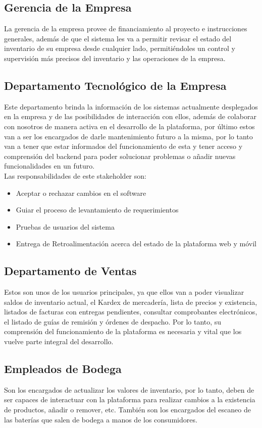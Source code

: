 \documentclass{scrreprt}
\begin{document}
\subsection{Gerencia de la Empresa}
La gerencia de la empresa provee de financiamiento al proyecto e instrucciones generales, además de que el sistema les va a permitir revisar el estado del inventario de su empresa desde cualquier lado, permitiéndoles un control y supervisión más precisos del inventario y las operaciones de la empresa. 

\subsection{Departamento Tecnológico de la Empresa}
Este departamento brinda la información de los sistemas actualmente desplegados en la empresa y de las posibilidades de interacción con ellos, además de colaborar con nosotros de manera activa en el desarrollo de la plataforma, por último estos van a ser los encargados de darle mantenimiento futuro a la misma, por lo tanto van a tener que estar informados del funcionamiento de esta y tener acceso y comprensión del backend para poder solucionar problemas o añadir nuevas funcionalidades en un futuro.\\
Las responsabilidades de este stakeholder son:
\begin{itemize}
    \item Aceptar o rechazar cambios en el software
    \item Guiar el proceso de levantamiento de requerimientos 
    \item Pruebas de usuarios del sistema
    \item Entrega de Retroalimentación acerca del estado de la plataforma web y móvil
\end{itemize}

\subsection{Departamento de Ventas}
Estos son unos de los usuarios principales, ya que ellos van a poder visualizar saldos de inventario actual, el Kardex de mercadería, lista de precios y existencia, listados de facturas con entregas pendientes, consultar comprobantes electrónicos, el listado de guías de remisión y órdenes de despacho. Por lo tanto, su comprensión del funcionamiento de la plataforma es necesaria y vital que los vuelve parte integral del desarrollo. 

\subsection{Empleados de Bodega}
Son los encargados de actualizar los valores de inventario, por lo tanto, deben de ser capaces de interactuar con la plataforma para realizar cambios a la existencia de productos, añadir o remover, etc. También son los encargados del escaneo de las baterías que salen de bodega a manos de los consumidores. 
\end{document}
